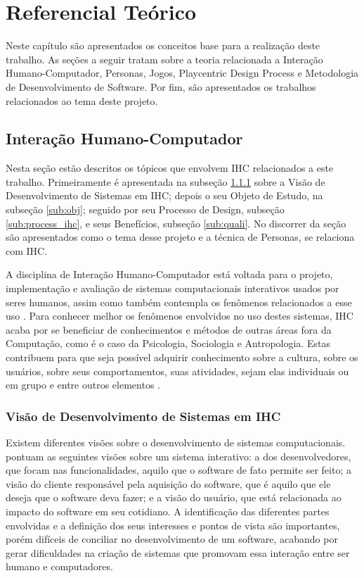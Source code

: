 \chapter{Referencial Teórico}
\label{chap:ref}

Neste capítulo são apresentados os conceitos base para a realização deste trabalho. As seções a seguir tratam sobre a teoria relacionada a Interação Humano-Computador, Personas, Jogos, Playcentric Design Process e Metodologia de Desenvolvimento de Software. Por fim, são apresentados os trabalhos relacionados ao tema deste projeto.

\section{Interação Humano-Computador}

Nesta seção estão descritos os tópicos que envolvem IHC relacionados a este trabalho. Primeiramente é apresentada na subseção \ref{sub:visao_ihc} sobre a Visão de  Desenvolvimento de Sistemas em IHC; depois o seu Objeto de Estudo, na subseção \ref{sub:obj}; seguido por seu Processo de Design, subseção \ref{sub:process_ihc}, e seus Benefícios, subseção \ref{sub:quali}. No discorrer da seção são apresentados como o tema desse projeto e a técnica de Personas, se relaciona com IHC.

A disciplina de Interação Humano-Computador está voltada para o projeto, implementação e avaliação de sistemas computacionais interativos usados por seres humanos, assim como também contempla os fenômenos relacionados a esse uso \cite{hewett1992}. Para conhecer melhor os fenômenos envolvidos no uso destes sistemas, IHC acaba por se beneficiar de conhecimentos e métodos de outras áreas fora da Computação, como é o caso da Psicologia, Sociologia e Antropologia. Estas contribuem para que seja possível adquirir conhecimento sobre a cultura, sobre os usuários, sobre seus comportamentos, suas atividades, sejam elas individuais ou em grupo e entre outros elementos \cite[p. 2, 12]{barbosa_silva}.%

\subsection{Visão de Desenvolvimento de Sistemas em IHC}
\label{sub:visao_ihc}
Existem diferentes visões sobre o desenvolvimento de sistemas computacionais.  pontuam as seguintes visões sobre um sistema interativo: a dos desenvolvedores, que focam nas funcionalidades, aquilo que o software de fato permite ser feito; a visão do cliente responsável pela aquisição do software, que é aquilo que ele deseja que o software deva fazer; e a visão do usuário, que está relacionada ao impacto do software em seu cotidiano. A identificação das diferentes partes envolvidas e a definição dos seus interesses e pontos de vista são importantes, porém difíceis de conciliar no desenvolvimento de um software, acabando por gerar dificuldades na criação de sistemas que promovam essa interação entre ser humano e computadores. %

